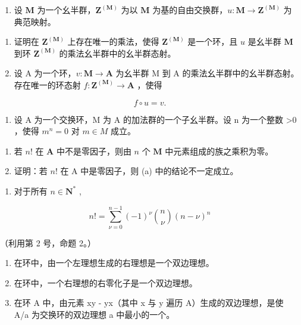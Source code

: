 \begin{enumerate}
\def\labelenumi{\arabic{enumi}.}
\setcounter{enumi}{4}
\tightlist
\item
  设 \(\mathbf{M}\) 为一个幺半群，\(\mathbf{Z}^{(\mathbf{M})}\) 为以 \(\mathbf{M}\) 为基的自由交换群，\(u\colon \mathbf{M}\to \mathbf{Z}^{(\mathbf{M})}\) 为典范映射。
\end{enumerate}

\begin{enumerate}
\def\labelenumi{(\alph{enumi})}
\item
  证明在 \(\mathbf{Z}^{(\mathbf{M})}\) 上存在唯一的乘法，使得 \(\mathbf{Z}^{(\mathbf{M})}\) 是一个环，且 \(u\) 是幺半群 \(\mathbf{M}\) 到环 \(\mathbf{Z}^{(\mathbf{M})}\) 的乘法幺半群中的幺半群态射。
\item
  设 A 为一个环，\(v: \mathbf{M} \to \mathbf{A}\) 为幺半群 M 到 A 的乘法幺半群中的幺半群态射。存在唯一的环态射 \(f: \mathbf{Z}^{(\mathbf{M})} \to \mathbf{A}\) ，使得
\end{enumerate}

\[
f \circ u = v.
\]

\begin{enumerate}
\def\labelenumi{\arabic{enumi}.}
\setcounter{enumi}{5}
\tightlist
\item
  设 A 为一个交换环，M 为 A 的加法群的一个子幺半群。设 n 为一个整数 \textgreater0 ，使得 \(m^{n} = 0\) 对 \(m \in M\) 成立。
\end{enumerate}

\begin{enumerate}
\def\labelenumi{(\alph{enumi})}
\item
  若 \(n!\) 在 \(\mathbf{A}\) 中不是零因子，则由 \(n\) 个 \(\mathbf{M}\) 中元素组成的族之乘积为零。
\item
  证明：若 \(n!\) 在 A 中是零因子，则 (a) 中的结论不一定成立。
\end{enumerate}

\begin{enumerate}
\def\labelenumi{\arabic{enumi}.}
\setcounter{enumi}{6}
\tightlist
\item
  对于所有 \(n \in \mathbf{N}^*\) ,
\end{enumerate}

\[
n! = \sum_ {\nu = 0} ^ {n - 1} (- 1) ^ {\nu} \binom {n} {\nu} (n - \nu) ^ {n}
\]

（利用第 2 号，命题 2。）

\begin{enumerate}
\def\labelenumi{\arabic{enumi}.}
\setcounter{enumi}{7}
\item
  在环中，由一个左理想生成的右理想是一个双边理想。
\item
  在环中，一个右理想的右零化子是一个双边理想。
\item
  在环 A 中，由元素 xy - yx（其中 x 与 y 遍历 A）生成的双边理想，是使 A/a 为交换环的双边理想 a 中最小的一个。
\end{enumerate}

